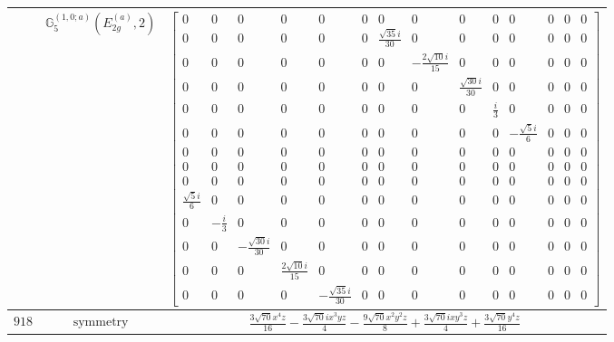 \documentclass[fleqn,8pt,landscape]{jsarticle}
\begin{document}
\begin{longtable}{ccc}
$  $ & $ \mathbb{G}_{5}^{(1,0;a)}(E_{2g}^{(a)},2) $ & $ \begin{bmatrix} 0 & 0 & 0 & 0 & 0 & 0 & 0 & 0 & 0 & 0 & 0 & 0 & 0 & 0 \\ 0 & 0 & 0 & 0 & 0 & 0 & \frac{\sqrt{35} i}{30} & 0 & 0 & 0 & 0 & 0 & 0 & 0 \\ 0 & 0 & 0 & 0 & 0 & 0 & 0 & - \frac{2 \sqrt{10} i}{15} & 0 & 0 & 0 & 0 & 0 & 0 \\ 0 & 0 & 0 & 0 & 0 & 0 & 0 & 0 & \frac{\sqrt{30} i}{30} & 0 & 0 & 0 & 0 & 0 \\ 0 & 0 & 0 & 0 & 0 & 0 & 0 & 0 & 0 & \frac{i}{3} & 0 & 0 & 0 & 0 \\ 0 & 0 & 0 & 0 & 0 & 0 & 0 & 0 & 0 & 0 & - \frac{\sqrt{5} i}{6} & 0 & 0 & 0 \\ 0 & 0 & 0 & 0 & 0 & 0 & 0 & 0 & 0 & 0 & 0 & 0 & 0 & 0 \\ 0 & 0 & 0 & 0 & 0 & 0 & 0 & 0 & 0 & 0 & 0 & 0 & 0 & 0 \\ 0 & 0 & 0 & 0 & 0 & 0 & 0 & 0 & 0 & 0 & 0 & 0 & 0 & 0 \\ \frac{\sqrt{5} i}{6} & 0 & 0 & 0 & 0 & 0 & 0 & 0 & 0 & 0 & 0 & 0 & 0 & 0 \\ 0 & - \frac{i}{3} & 0 & 0 & 0 & 0 & 0 & 0 & 0 & 0 & 0 & 0 & 0 & 0 \\ 0 & 0 & - \frac{\sqrt{30} i}{30} & 0 & 0 & 0 & 0 & 0 & 0 & 0 & 0 & 0 & 0 & 0 \\ 0 & 0 & 0 & \frac{2 \sqrt{10} i}{15} & 0 & 0 & 0 & 0 & 0 & 0 & 0 & 0 & 0 & 0 \\ 0 & 0 & 0 & 0 & - \frac{\sqrt{35} i}{30} & 0 & 0 & 0 & 0 & 0 & 0 & 0 & 0 & 0 \end{bmatrix} $ \\ \hline
$ 918 $ & $ \text{symmetry} $ & $ \frac{3 \sqrt{70} x^{4} z}{16} - \frac{3 \sqrt{70} i x^{3} y z}{4} - \frac{9 \sqrt{70} x^{2} y^{2} z}{8} + \frac{3 \sqrt{70} i x y^{3} z}{4} + \frac{3 \sqrt{70} y^{4} z}{16} $ \\

\end{longtable}
\end{document}
